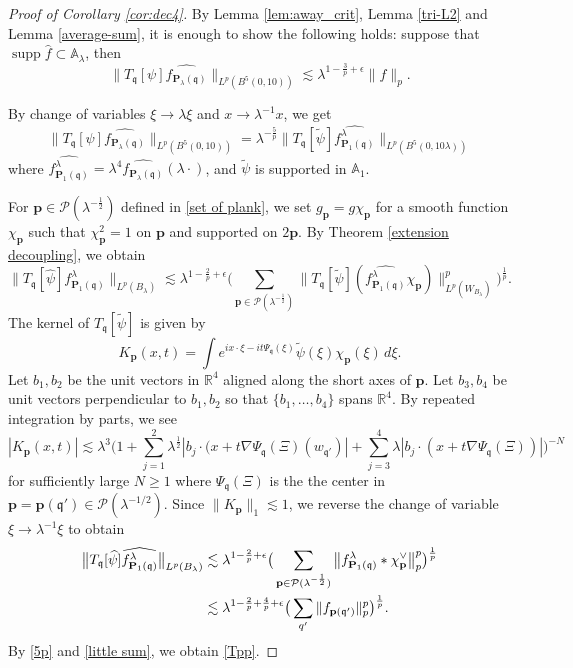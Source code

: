 \documentclass[10pt] %
{amsart}
\theoremstyle{plain}
\numberwithin{equation}{section}
\newcommand{\R}{\mathbb R}
\DeclareMathOperator{\supp}{supp}
\newcommand{\fq}{\mathfrak q}
\newcommand{\fm}{\mathfrak{q'}}
\begin{document}
\begin{proof}[Proof of Corollary \ref{cor:dec4}]
By Lemma \ref{lem:away_crit}, Lemma \ref{tri-L2} and Lemma \ref{average-sum}, it is enough to show the following holds: suppose that $\supp \widehat f \subset \mathbb A_\lambda$, then
\begin{equation}\label{Tpp}
\big\|T_\fq [\psi] \widehat {f_{\mathbf P_\lambda(\fq)}} \big\|_{L^p(B^5(0,10))}
\lesssim \lambda^{1-\frac 3p+\epsilon}   \|f \|_p .
\end{equation}

By change of variables $\xi \to \lambda\xi$ and $x\rightarrow \lambda^{-1}x$, we get
\begin{equation}\label{5p}
\big\|T_\fq [\psi] \widehat {f_{\mathbf P_\lambda(\fq)}} \big\|_{L^p(B^5(0,10))} = \lambda^{-\frac 5 p }  \big\|T_\fq [\widetilde\psi] \widehat { f^\lambda_{\mathbf P_1(\fq)}} \big\|_{L^p(B^5(0,10\lambda))}
\end{equation}
where $\widehat{f^\lambda_{\mathbf P_1(\fq)}}=\lambda^4 \widehat{f_{\mathbf P_\lambda(\fq)}}(\lambda\cdot)$, and $\widetilde\psi$ is supported in $\mathbb A_1$. 

 For $\mathbf p \in \mathcal P(\lambda^{-\frac12})$ defined in \eqref{set of plank}, we set $g_{\mathbf p} = g \chi_{\mathbf p}$ for a smooth function $\chi_{\mathbf p}$ such that $\chi_{\mathbf p}^2 =1$ on $\mathbf p$ and supported on $2\mathbf p$.
By Theorem \ref{extension decoupling}, we obtain
\[
\big\|T_\fq [\widehat\psi]\widehat { f^\lambda_{\mathbf P_1(\fq)}} \big\|_{L^p(B_\lambda )} \lesssim \lambda^{1-\frac2p+\epsilon} \big(\sum_{\mathbf p \in \mathcal P(\lambda^{-\frac12})} \big\|  T_{\fq}[\widetilde\psi] (\widehat { f^\lambda_{\mathbf P_1(\fq)}}\chi_{\mathbf p}) \big\|_{L^p(W_{B_\lambda})}^p \big)^{\frac1p}.
\]
The kernel of $T_{\fq}[\widetilde\psi]$ is given by
\[
K_{\mathbf p} (x,t) = \int e^{ix\cdot \xi-it\Psi_{\fq}(\xi)} \widetilde\psi(\xi)\chi_{\mathbf p}(\xi)\,d\xi.
\]
Let $b_1,b_2$ be the unit vectors in $\R^4$ aligned along the short axes of $\mathbf p$. 
Let $b_3,b_4$ be unit vectors perpendicular to $b_1, b_2$ so that $\{b_1,\dots,b_4\}$ spans $\R^4$.
By repeated integration by parts, we see
\[
|K_{\mathbf p} (x,t)| \lesssim \lambda^{3}\big(1+\sum_{j=1}^2 \lambda^{\frac12}| b_j \cdot (x+t\nabla\Psi_{\fq}(\Xi)(w_{\fm})|
+\sum_{j=3}^4 \lambda| b_j \cdot (x+t\nabla \Psi_{\fq}(\Xi) ) | \big)^{-N}
\]
for sufficiently large $N\ge1$ where $\Psi_{\fq}(\Xi)$ is the the center in $\mathbf p =\mathbf p(\fm) \in \mathcal P(\lambda^{-1/2})$.
Since $\|K_{\mathbf p}\|_1\lesssim 1$, we reverse the change of variable $\xi \to \lambda^{-1}\xi$ to obtain 
\begin{align*}
\big\|T_\fq [\widehat\psi]\widehat { f^\lambda_{\mathbf P_1(\fq)}} \big\|_{L^p(B_\lambda )}
&  \lesssim \lambda^{1-\frac2p+\epsilon} \big(\sum_{\mathbf p \in \mathcal P(\lambda^{-\frac12})} \big\|   f^\lambda_{\mathbf P_1(\fq)}\ast \chi^\vee_{\mathbf p}    \big\|_{p}^p \big)^{\frac1p}   \\
& \lesssim \lambda^{1-\frac 2p+\frac 4 p+\epsilon} \big(\sum_{\mathbf \fm} \|f_{\mathbf p(\fm)}\|_p^p\big)^{\frac1p}.
\end{align*}
By \eqref{5p} and \eqref{little sum}, we obtain \eqref{Tpp}.
\end{proof}
\end{document}

